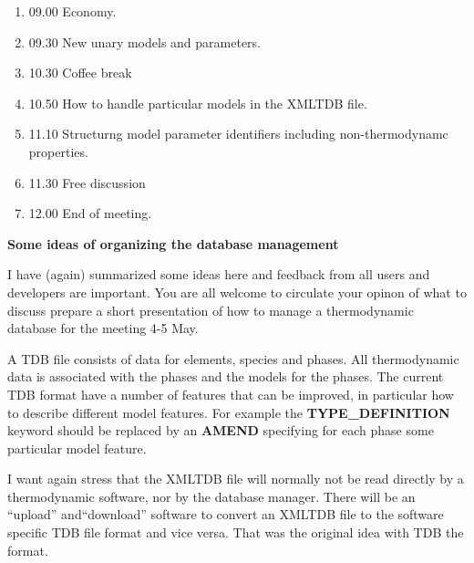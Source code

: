 \documentclass[12pt]{article}
\begin{document}
\begin{enumerate}
\item 09.00 Economy.

\item 09.30 New unary models and parameters.

\item 10.30 Coffee break

\item 10.50 How to handle particular models in the XMLTDB file.

\item 11.10 Structurng model parameter identifiers including
  non-thermodynamc properties.

\item 11.30 Free discussion

\item 12.00 End of meeting.

\end{enumerate}

\newpage

{\bf \large Some ideas of organizing the database management}

I have (again) summarized some ideas here and feedback from all users
and developers are important.  You are all welcome to circulate your
opinon of what to discuss prepare a short presentation of how to
manage a thermodynamic database for the meeting 4-5 May.

A TDB file consists of data for elements, species and phases.  All
thermodynamic data is associated with the phases and the models for
the phases.  The current TDB format have a number of features that can
be improved, in particular how to describe different model features.
For example the {\bf TYPE\_DEFINITION} keyword should be replaced by
an {\bf AMEND} specifying for each phase some particular model
feature.

I want again stress that the XMLTDB file will normally not be read
directly by a thermodynamic software, nor by the database manager.
There will be an ``upload'' and``download'' software to convert an
XMLTDB file to the software specific TDB file format and vice versa.
That was the original idea with TDB the format.
\end{document}
